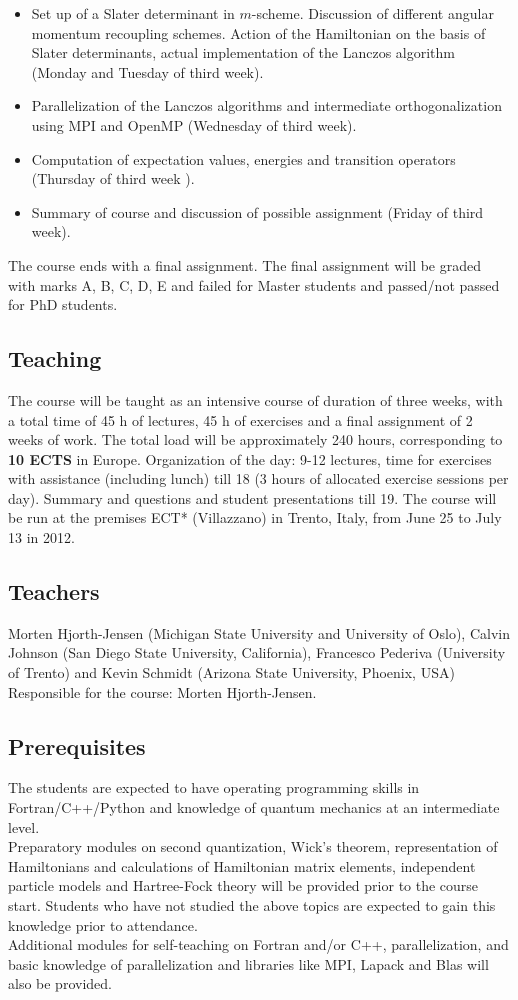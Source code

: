 \documentclass[prc,amsart,english]{revtex4}
\begin{document}
\begin{enumerate}
\begin{itemize}
\item Set up of a Slater determinant in $m$-scheme. Discussion of different angular momentum recoupling schemes.
Action of the Hamiltonian on the basis of Slater determinants, actual implementation of the Lanczos
algorithm (Monday and Tuesday of third week).
\item Parallelization of the Lanczos algorithms and intermediate orthogonalization using MPI and OpenMP (Wednesday of third week).
\item Computation of expectation values, energies and transition operators (Thursday of third week ).
\item Summary of course and discussion of possible assignment (Friday of third week).
\end{itemize}
\end{enumerate}
The course ends with a final assignment. The final assignment will be graded
with marks A, B, C, D, E and failed for Master students and passed/not passed for PhD students.

\subsection{Teaching}
The course will be taught as an intensive  course of duration of three weeks, with a
total time of 45 h of lectures, 45 h of exercises and  a final assignment of 2 weeks of work.
The total load will be approximately 240 hours, corresponding to  {\bf 10 ECTS} in Europe.
Organization of the day: 9-12 lectures, time for exercises with assistance (including lunch)
till 18 (3 hours of allocated exercise sessions per day).
Summary and questions and student presentations till 19.
The course will be run at the premises ECT* (Villazzano) in Trento, Italy, from
June 25 to July 13 in 2012.

\subsection{Teachers}
Morten Hjorth-Jensen (Michigan State University and University of Oslo), Calvin Johnson (San Diego State University, California), Francesco Pederiva (University of Trento) and Kevin Schmidt (Arizona State University, Phoenix, USA)
Responsible for the course: Morten Hjorth-Jensen.
\subsection{Prerequisites}
The students are expected to have operating programming skills in Fortran/C++/Python and knowledge of
quantum mechanics at an intermediate level. \\
Preparatory modules on second quantization, Wick's theorem,
representation of Hamiltonians and calculations of Hamiltonian matrix elements, independent particle models and Hartree-Fock theory will be provided prior to the course start. Students who have not studied the above topics are expected to gain this knowledge prior to attendance. \\
Additional modules for self-teaching on
Fortran and/or C++, parallelization, and basic knowledge of parallelization and
libraries like MPI, Lapack and Blas will also be provided.
\end{document}

